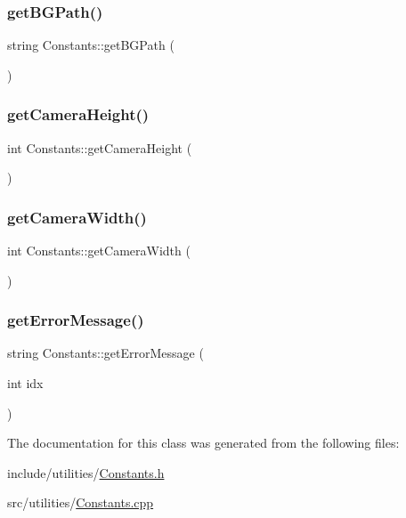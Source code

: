 \subsubsection{\texorpdfstring{get\+B\+G\+Path()}{getBGPath()}}
{\footnotesize\ttfamily string Constants\+::get\+B\+G\+Path (\begin{DoxyParamCaption}{ }\end{DoxyParamCaption})}

\mbox{\label{classConstants_a04a1764de8928d2fca5cf2555735a405}} 
\subsubsection{\texorpdfstring{get\+Camera\+Height()}{getCameraHeight()}}
{\footnotesize\ttfamily int Constants\+::get\+Camera\+Height (\begin{DoxyParamCaption}{ }\end{DoxyParamCaption})}

\mbox{\label{classConstants_a99ee472396cb27f43e1c17541e9cd071}} 
\subsubsection{\texorpdfstring{get\+Camera\+Width()}{getCameraWidth()}}
{\footnotesize\ttfamily int Constants\+::get\+Camera\+Width (\begin{DoxyParamCaption}{ }\end{DoxyParamCaption})}

\mbox{\label{classConstants_a2017e0f60d08822215e0876e50e7a671}} 
\subsubsection{\texorpdfstring{get\+Error\+Message()}{getErrorMessage()}}
{\footnotesize\ttfamily string Constants\+::get\+Error\+Message (\begin{DoxyParamCaption}\item[{int}]{idx }\end{DoxyParamCaption})}



The documentation for this class was generated from the following files\+:\begin{DoxyCompactItemize}
\item 
include/utilities/\hyperlink{Constants_8h}{Constants.\+h}\item 
src/utilities/\hyperlink{Constants_8cpp}{Constants.\+cpp}\end{DoxyCompactItemize}

